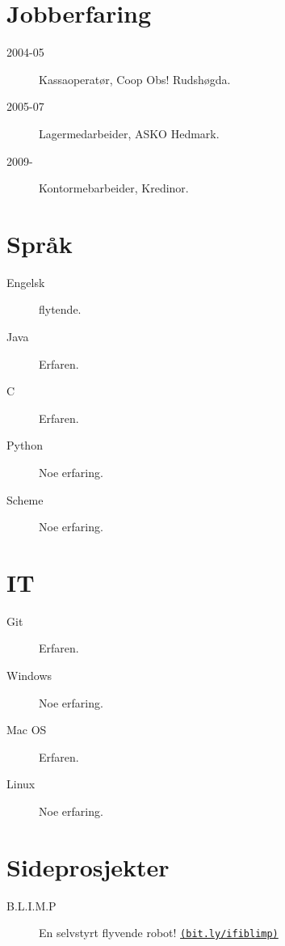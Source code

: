 \documentclass[margin,line,a4paper]{resume}
\begin{document}
\begin{resume}
\section{\mysidestyle Jobberfaring}%
\begin{description}
\item[2004-05] Kassaoperatør, Coop Obs! Rudshøgda.
\item[2005-07] Lagermedarbeider, ASKO Hedmark.
\item[2009-] Kontormebarbeider, Kredinor.
\end{description}

\section{\mysidestyle Språk}%
\begin{description}
\item[Engelsk] flytende.
\item[Java] Erfaren.
\item[C] Erfaren.
\item[Python] Noe erfaring.
\item[Scheme] Noe erfaring.
\end{description}

\section{\mysidestyle IT}%
\begin{description}
\item[Git] Erfaren.
\item[Windows] Noe erfaring.
\item[Mac OS] Erfaren.
    \item[Linux] Noe erfaring.
\end{description}


\section{\mysidestyle Sideprosjekter}%
\begin{description}
\item[B.L.I.M.P] En selvstyrt flyvende
robot! \href{http://bit.ly/ifiblimp}{\tt{(bit.ly/ifiblimp)}}
\end{description}


\end{resume}
\end{document}

